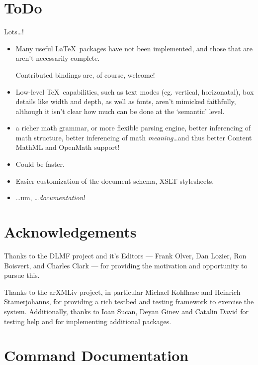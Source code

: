 \documentclass{book}
\begin{document}
\chapter{ToDo}\label{todo}
Lots\ldots!
\begin{itemize}
\item Many useful \LaTeX\ packages have not been implemented, and those
  that are aren't necessarily complete.

  Contributed bindings are, of course, welcome!
\item Low-level \TeX\ capabilities, such as text modes (eg. vertical, horizonatal),
 box details like width and depth, as well as fonts,  aren't mimicked faithfully,
  although it isn't clear how much can be done at the `semantic' level.
\item a richer math grammar, or more flexible parsing engine,
  better inferencing of math structure,
  better inferencing of math \emph{meaning}\ldots and thus better
  Content MathML and OpenMath support!
\item Could be faster.
\item Easier customization of the document schema, XSLT stylesheets.
\item \ldots um, \ldots \emph{documentation}!
\end{itemize}

\chapter*{Acknowledgements}\label{acknowledgements}
Thanks to the DLMF project and it's Editors ---
Frank Olver, Dan Lozier, Ron Boisvert, and Charles Clark ---
for providing the motivation and opportunity to pursue this.

Thanks to the arXMLiv project, in particular Michael Kohlhase and Heinrich Stamerjohanns,
for providing a rich testbed and testing framework to exercise the system.
Additionally, thanks to Ioan Sucan, Deyan Ginev
and Catalin David for testing help and for implementing additional packages.

\appendix
\chapter[Commands]{Command Documentation}\label{commands}






\end{document}
